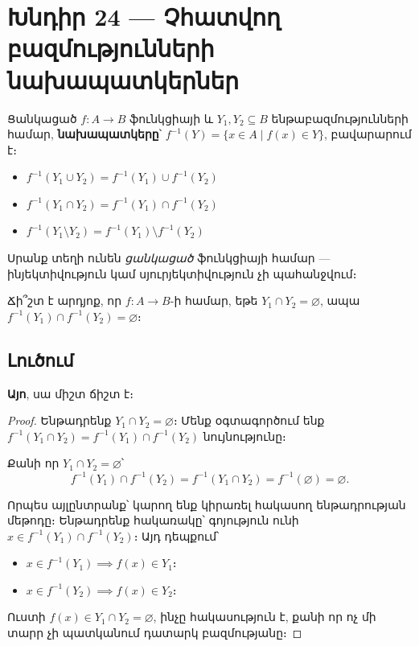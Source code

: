 \documentclass[12pt, a4paper]{article}
\begin{document}
\newpage
\section{Խնդիր 24 — Չհատվող բազմությունների նախապատկերներ}

\begin{theorybox}
Ցանկացած $f : A \to B$ ֆունկցիայի և $Y_1, Y_2 \subseteq B$ ենթաբազմությունների համար, \textbf{նախապատկերը}՝
$f^{-1}(Y) = \{x \in A \mid f(x) \in Y\}$, բավարարում է։
\begin{itemize}[nosep]
  \item $f^{-1}(Y_1 \cup Y_2) = f^{-1}(Y_1) \cup f^{-1}(Y_2)$
  \item $f^{-1}(Y_1 \cap Y_2) = f^{-1}(Y_1) \cap f^{-1}(Y_2)$
  \item $f^{-1}(Y_1 \setminus Y_2) = f^{-1}(Y_1) \setminus f^{-1}(Y_2)$
\end{itemize}
Սրանք տեղի ունեն \emph{ցանկացած} ֆունկցիայի համար — ինյեկտիվություն կամ սյուրյեկտիվություն չի պահանջվում։
\end{theorybox}

\begin{problembox}
Ճի՞շտ է արդյոք, որ $f : A \to B$-ի համար, եթե $Y_1 \cap Y_2 = \varnothing$, ապա
$f^{-1}(Y_1) \cap f^{-1}(Y_2) = \varnothing$։
\end{problembox}

\subsection*{Լուծում}

\textbf{Այո}, սա միշտ ճիշտ է։

\begin{proof}
Ենթադրենք $Y_1 \cap Y_2 = \varnothing$։ Մենք օգտագործում ենք $f^{-1}(Y_1 \cap Y_2) = f^{-1}(Y_1) \cap f^{-1}(Y_2)$ նույնությունը։

Քանի որ $Y_1 \cap Y_2 = \varnothing$՝
\[
  f^{-1}(Y_1) \cap f^{-1}(Y_2) = f^{-1}(Y_1 \cap Y_2) = f^{-1}(\varnothing) = \varnothing.
\]

Որպես այլընտրանք՝ կարող ենք կիրառել հակասող ենթադրության մեթոդը։ Ենթադրենք հակառակը՝ գոյություն ունի
$x \in f^{-1}(Y_1) \cap f^{-1}(Y_2)$։ Այդ դեպքում՝
\begin{itemize}[nosep]
  \item $x \in f^{-1}(Y_1) \implies f(x) \in Y_1$։
  \item $x \in f^{-1}(Y_2) \implies f(x) \in Y_2$։
\end{itemize}
Ուստի $f(x) \in Y_1 \cap Y_2 = \varnothing$, ինչը հակասություն է, քանի որ ոչ մի տարր չի պատկանում դատարկ բազմությանը։
\end{proof}
\end{document}
